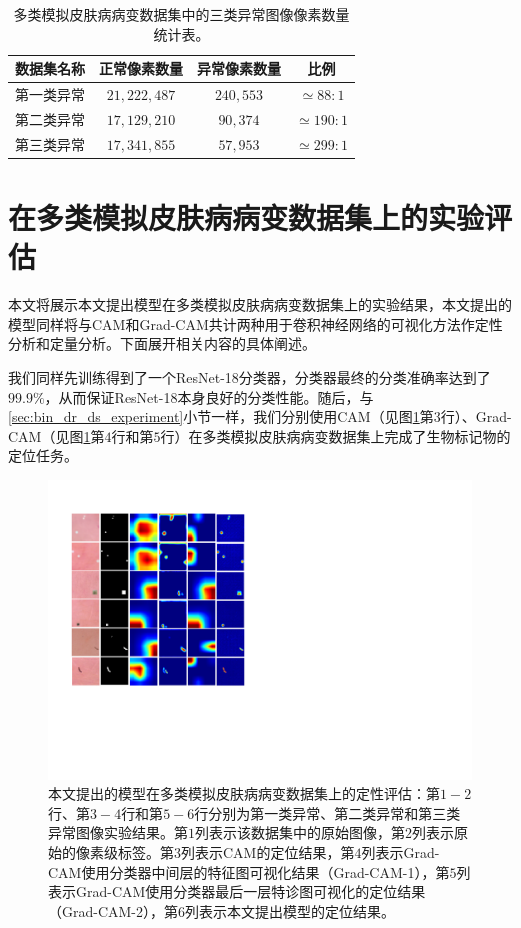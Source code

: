 \begin{table}[h]
	\centering
	\caption{多类模拟皮肤病病变数据集中的三类异常图像像素数量统计表。}
	\label{tab:multi_ds_pixel_freqs}
	\begin{tabular}{c|c|c|c}
		\toprule[2pt]
		数据集名称 & 正常像素数量 & 异常像素数量 & 比例 \\
		\midrule[2pt]
		第一类异常&  $21,222,487$ & $240,553$ & $\simeq 88: 1$ \\ \hline
		第二类异常&  $17,129,210$ & $90,374$ & $\simeq 190: 1$ \\ \hline
		第三类异常 & $17,341,855$ & $57,953$ & $\simeq 299: 1$ \\
		\bottomrule[2pt]
	\end{tabular}
\end{table}

\section{在多类模拟皮肤病病变数据集上的实验评估}\label{sec:multi_classes_experiments_res}
本文将展示本文提出模型在多类模拟皮肤病病变数据集上的实验结果，本文提出的模型同样将与CAM和Grad-CAM共计两种用于卷积神经网络的可视化方法作定性分析和定量分析。下面展开相关内容的具体阐述。

我们同样先训练得到了一个ResNet-18分类器，分类器最终的分类准确率达到了$99.9\%$，从而保证ResNet-18本身良好的分类性能。随后，与\ref{sec:bin_dr_ds_experiment}小节一样，我们分别使用CAM（见图\ref{fig:multi_simulated_skin_res}第$3$行）、Grad-CAM（见图\ref{fig:multi_simulated_skin_res}第$4$行和第$5$行）在多类模拟皮肤病病变数据集上完成了生物标记物的定位任务。
\begin{figure}[h]
	\centering
	\includegraphics[width=1.0\textwidth]{figure/multi_simulated_skin_res.pdf}
	\caption{本文提出的模型在多类模拟皮肤病病变数据集上的定性评估：第$1-2$行、第$3-4$行和第$5-6$行分别为第一类异常、第二类异常和第三类异常图像实验结果。第$1$列表示该数据集中的原始图像，第$2$列表示原始的像素级标签。第$3$列表示CAM的定位结果，第$4$列表示Grad-CAM使用分类器中间层的特征图可视化结果（Grad-CAM-1），第$5$列表示Grad-CAM使用分类器最后一层特诊图可视化的定位结果（Grad-CAM-2），第$6$列表示本文提出模型的定位结果。}
	\label{fig:multi_simulated_skin_res}
\end{figure}

